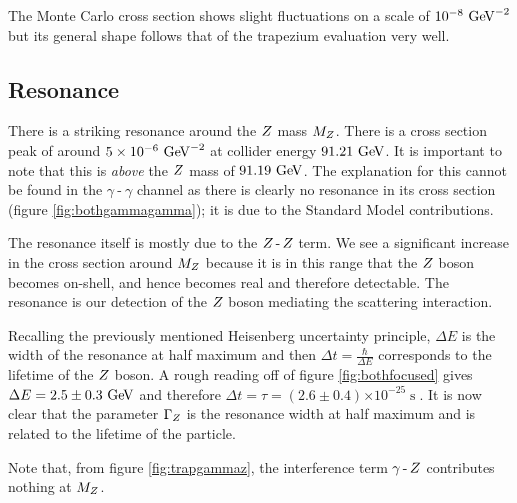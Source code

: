\documentclass[]{article}
\providecommand{\e}[1]{\ensuremath{\times 10^{#1}}}
\begin{document}
The Monte Carlo cross section shows slight fluctuations on a scale of $10^{-8}\GeV^{-2}$ but its general shape follows that of the trapezium evaluation very well.

\subsection{Resonance}\label{ssec:resonance}

There is a striking resonance around the $Z $ mass $M_{Z }$. There is a cross section peak of around $5\e{-6}\GeV^{-2}$ at collider energy $91.21\GeV$. It is important to note that this is \emph{above} the $Z $ mass of $91.19\GeV$. The explanation for this cannot be found in the $\gamma\operatorname{-}\gamma$ channel as there is clearly no resonance in its cross section (figure \ref{fig:bothgammagamma}); it is due to the Standard Model contributions.

The resonance itself is mostly due to the $Z \operatorname{-}Z $ term. We see a significant increase in the cross section around $M_{Z }$ because it is in this range that the $Z $ boson becomes on-shell, and hence becomes real and therefore detectable. The resonance is our detection of the $Z $ boson mediating the scattering interaction.

Recalling the previously mentioned Heisenberg uncertainty principle, $\Delta E$ is the width of the resonance at half maximum and then $\Delta t = \frac{\hbar}{\Delta E}$ corresponds to the lifetime of the $Z $ boson. A rough reading off of figure \ref{fig:bothfocused} gives $\Delta E = 2.5\pm0.3\GeV$ and therefore $\Delta t = \tau = (2.6\pm0.4)\e{-25} \operatorname{s}$. It is now clear that the parameter $\Gamma_{Z }$ is the resonance width at half maximum and is related to the lifetime of the particle.

Note that, from figure \ref{fig:trapgammaz}, the interference term $\gamma\operatorname{-}Z $ contributes nothing at $M_{Z }$.\footnotemark

\end{document}
